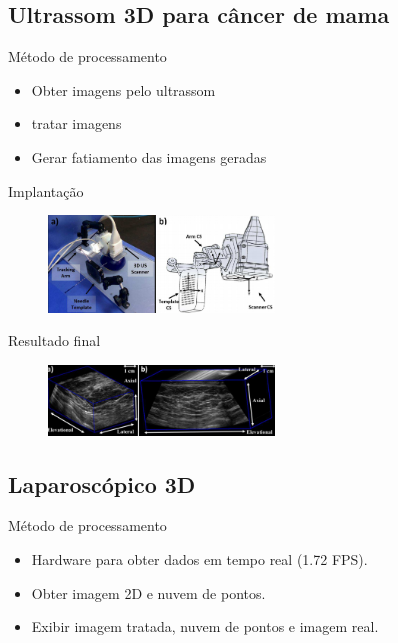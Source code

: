 \documentclass{beamer}
\begin{document}
\subsection{Ultrassom 3D para câncer de mama}

\begin{frame}{Método de processamento}
  \begin{itemize}
  \item {
    Obter imagens pelo ultrassom
  }
  \item {
   tratar imagens
  }
  \item {
    Gerar fatiamento das imagens geradas
  }
  \end{itemize}
\end{frame}

\begin{frame}{Implantação}
  \begin{figure}[htb]
    \label{fig:implantacao}
    \includegraphics[width=6cm]{./img/implantacao.png}
    \centering
    \end{figure}
\end{frame}

\begin{frame}{Resultado final}
    \begin{figure}[htb]
    \label{fig:scanner3d_final}
    \includegraphics[width=6cm]{./img/scanner3d_final.png}
    \centering
    \end{figure}
\end{frame}


\subsection{Laparoscópico 3D}

\begin{frame}{Método de processamento}
  \begin{itemize}
  \item {
    Hardware para obter dados em tempo real (1.72 FPS).
  }
  \item {
    Obter imagem 2D e nuvem de pontos.
  }
  \item {
    Exibir imagem tratada, nuvem de pontos e imagem real.
  }
  \end{itemize}
\end{frame}
\end{document}
